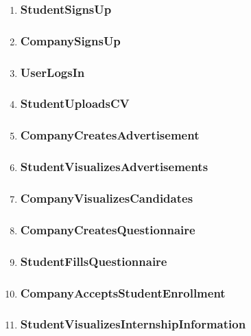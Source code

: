 \begin{enumerate}[label=\textbf{RV\arabic* -}]

\item \subsubsection{StudentSignsUp}
\item \subsubsection{CompanySignsUp}
\item \subsubsection{UserLogsIn}
\item \subsubsection{StudentUploadsCV}
\item \subsubsection{CompanyCreatesAdvertisement}
\item \subsubsection{StudentVisualizesAdvertisements}
\item \subsubsection{CompanyVisualizesCandidates}
\item \subsubsection{CompanyCreatesQuestionnaire}
\item \subsubsection{StudentFillsQuestionnaire}
\item \subsubsection{CompanyAcceptsStudentEnrollment}
\item \subsubsection{StudentVisualizesInternshipInformation}

\end{enumerate}
